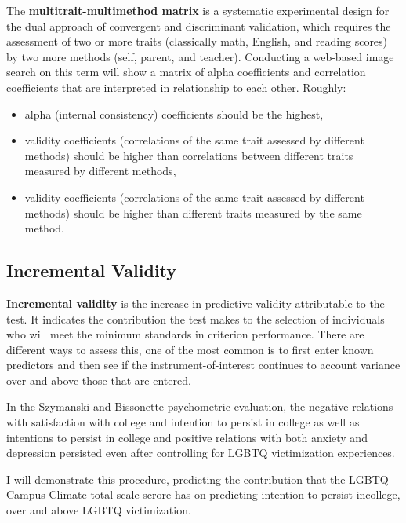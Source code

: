 \documentclass[
  english,
]{book}
\providecommand{\tightlist}{%
  \setlength{\itemsep}{0pt}\setlength{\parskip}{0pt}}
\begin{document}
The \textbf{multitrait-multimethod matrix} is a systematic experimental design for the dual approach of convergent and discriminant validation, which requires the assessment of two or more traits (classically math, English, and reading scores) by two more methods (self, parent, and teacher). Conducting a web-based image search on this term will show a matrix of alpha coefficients and correlation coefficients that are interpreted in relationship to each other. Roughly:

\begin{itemize}
\tightlist
\item
  alpha (internal consistency) coefficients should be the highest,
\item
  validity coefficients (correlations of the same trait assessed by different methods) should be higher than correlations between different traits measured by different methods,
\item
  validity coefficients (correlations of the same trait assessed by different methods) should be higher than different traits measured by the same method.
\end{itemize}

\hypertarget{incremental-validity}{%
\subsection{Incremental Validity}\label{incremental-validity}}

\textbf{Incremental validity} is the increase in predictive validity attributable to the test. It indicates the contribution the test makes to the selection of individuals who will meet the minimum standards in criterion performance. There are different ways to assess this, one of the most common is to first enter known predictors and then see if the instrument-of-interest continues to account variance over-and-above those that are entered.

In the Szymanski and Bissonette \citeyearpar{szymanski_perceptions_2020} psychometric evaluation, the negative relations with satisfaction with college and intention to persist in college as well as intentions to persist in college and positive relations with both anxiety and depression persisted even after controlling for LGBTQ victimization experiences.

I will demonstrate this procedure, predicting the contribution that the LGBTQ Campus Climate total scale scrore has on predicting intention to persist incollege, over and above LGBTQ victimization.
\end{document}
